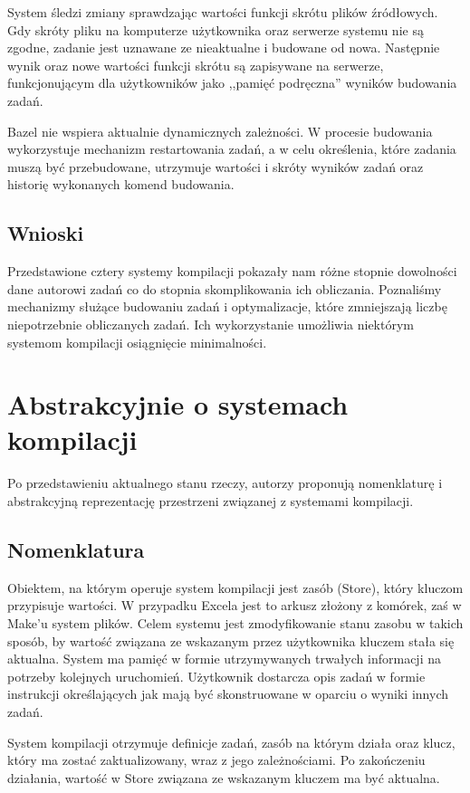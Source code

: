 System śledzi zmiany sprawdzając wartości funkcji skrótu plików źródłowych. Gdy skróty pliku na komputerze użytkownika oraz serwerze systemu nie są zgodne, zadanie jest uznawane ze nieaktualne i budowane od nowa. Następnie wynik oraz nowe wartości funkcji skrótu są zapisywane na serwerze, funkcjonującym dla użytkowników jako ,,pamięć podręczna'' wyników budowania zadań.

Bazel nie wspiera aktualnie dynamicznych zależności. W procesie budowania wykorzystuje mechanizm restartowania zadań, a w celu określenia, które zadania muszą być przebudowane, utrzymuje wartości i skróty wyników zadań oraz historię wykonanych komend budowania.

\subsection{Wnioski}

Przedstawione cztery systemy kompilacji pokazały nam różne stopnie dowolności dane autorowi zadań co do stopnia skomplikowania ich obliczania. Poznaliśmy mechanizmy służące budowaniu zadań i optymalizacje, które zmniejszają liczbę niepotrzebnie obliczanych zadań. Ich wykorzystanie umożliwia niektórym systemom kompilacji osiągnięcie minimalności.

\section{Abstrakcyjnie o systemach kompilacji}

Po przedstawieniu aktualnego stanu rzeczy, autorzy proponują nomenklaturę i abstrakcyjną reprezentację przestrzeni związanej z systemami kompilacji.

\subsection{Nomenklatura}

Obiektem, na którym operuje system kompilacji jest zasób (Store), który kluczom przypisuje wartości. W przypadku Excela jest to arkusz złożony z komórek, zaś w Make'u system plików. Celem systemu jest zmodyfikowanie stanu zasobu w takich sposób, by wartość związana ze wskazanym przez użytkownika kluczem stała się aktualna. System ma pamięć w formie utrzymywanych trwałych informacji na potrzeby kolejnych uruchomień. Użytkownik dostarcza opis zadań w formie instrukcji określających jak mają być skonstruowane w oparciu o wyniki innych zadań.

System kompilacji otrzymuje definicje zadań, zasób na którym działa oraz klucz, który ma zostać zaktualizowany, wraz z jego zależnościami. Po zakończeniu działania, wartość w Store związana ze wskazanym kluczem ma być aktualna.

